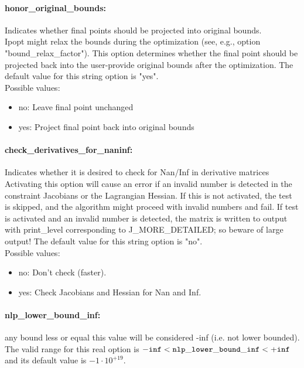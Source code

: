 \paragraph{honor\_original\_bounds:}\label{opt:honor_original_bounds} Indicates whether final points should be projected into original bounds. \\
 Ipopt might relax the bounds during the optimization (see, e.g., option "bound\_relax\_factor").  This option determines whether the final point should be projected back into the user-provide original bounds after the optimization. The default value for this string option is "yes".
\\ 
Possible values:
\begin{itemize}
   \item no: Leave final point unchanged
   \item yes: Project final point back into original bounds
\end{itemize}

\paragraph{check\_derivatives\_for\_naninf:}\label{opt:check_derivatives_for_naninf} Indicates whether it is desired to check for Nan/Inf in derivative matrices \\
 Activating this option will cause an error if an invalid number is detected in the constraint Jacobians or the Lagrangian Hessian.  If this is not activated, the test is skipped, and the algorithm might proceed with invalid numbers and fail.  If test is activated and an invalid number is detected, the matrix is written to output with print\_level corresponding to J\_MORE\_DETAILED; so beware of large output! The default value for this string option is "no".
\\ 
Possible values:
\begin{itemize}
   \item no: Don't check (faster).
   \item yes: Check Jacobians and Hessian for Nan and Inf.
\end{itemize}

\paragraph{nlp\_lower\_bound\_inf:}\label{opt:nlp_lower_bound_inf} any bound less or equal this value will be considered -inf (i.e. not lower bounded). \\
 The valid range for this real option is 
${\tt -inf} <  {\tt nlp\_lower\_bound\_inf } <  {\tt +inf}$
and its default value is $-1 \cdot 10^{+19}$.


